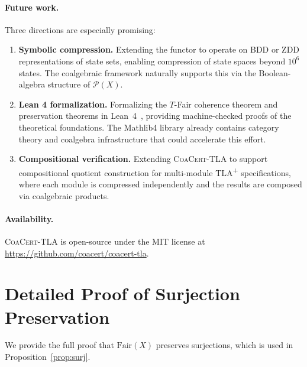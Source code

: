 \documentclass[11pt]{article}
\newcommand{\Pow}{\mathcal{P}}
\newcommand{\Fair}{\ensuremath{\mathrm{Fair}}}
\newcommand{\TFair}{$T$-Fair}
\newcommand{\CoaCert}{\textsc{CoaCert-TLA}}
\newcommand{\TLAplus}{TLA\textsuperscript{+}}
\begin{document}
\paragraph{Future work.}
Three directions are especially promising:
\begin{enumerate}[nosep]
\item \textbf{Symbolic compression.}
  Extending the functor to operate on BDD or ZDD representations of
  state sets, enabling compression of state spaces beyond $10^6$ states.
  The coalgebraic framework naturally supports this via the
  Boolean-algebra structure of $\Pow(X)$.

\item \textbf{Lean 4 formalization.}
  Formalizing the \TFair{} coherence theorem and preservation theorems
  in Lean~4~\cite{Lean4}, providing machine-checked proofs of the
  theoretical foundations.
  The Mathlib4 library already contains category theory and coalgebra
  infrastructure that could accelerate this effort.

\item \textbf{Compositional verification.}
  Extending \CoaCert{} to support compositional quotient construction
  for multi-module \TLAplus{} specifications, where each module is
  compressed independently and the results are composed via coalgebraic
  products.
\end{enumerate}

\paragraph{Availability.}
\CoaCert{} is open-source under the MIT license at
\url{https://github.com/coacert/coacert-tla}.

\appendix
\section{Detailed Proof of Surjection Preservation}
\label{app:surjection}

We provide the full proof that $\Fair(X)$ preserves surjections, which is
used in Proposition~\ref{prop:surj}.
\end{document}
